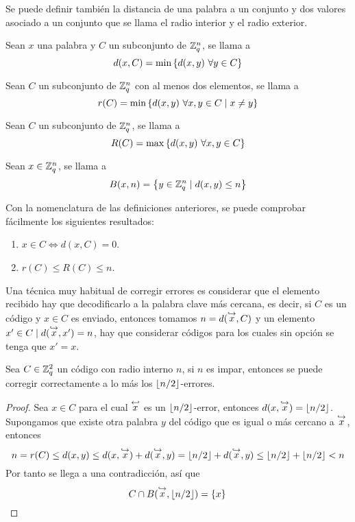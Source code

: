 Se puede definir también la distancia de una palabra a un conjunto y dos valores asociado a un conjunto que se llama el radio interior y el radio exterior.

\begin{definition}
	Sean $x$ una palabra y $C$ un subconjunto de $\mathbb{Z}_q^n$, se llama  a
	\[
		d(x, C) = \min\left\{d(x,y)\ \forall y\in C\right\}
	\]
\end{definition}

\begin{definition}
	Sean $C$ un subconjunto de $\mathbb{Z}_q^n$ con al menos dos elementos, se llama  a
	\[
		r(C) = \min\left\{d(x,y)\ \forall x,y\in C\mid x\neq y\right\}
	\]
\end{definition}

\begin{definition}
	Sean $C$ un subconjunto de $\mathbb{Z}_q^n$, se llama  a
	\[
		R(C) = \max\left\{d(x,y)\ \forall x,y\in C\right\}
	\]
\end{definition}

\begin{definition}
	Sean $x\in\mathbb{Z}_q^n$, se llama  a
	\[
		B(x, n) = \left\{y\in\mathbb{Z}_q^n \mid d(x,y)\leq n\right\}
	\]
\end{definition}

Con la nomenclatura de las definiciones anteriores, se puede comprobar fácilmente los siguientes resultados:
\begin{enumerate}
	\item $x\in C \iff d(x, C) = 0$.
	\item $r(C)\leq R(C) \leq n$.
\end{enumerate}

Una técnica muy habitual de corregir errores es considerar que el elemento recibido hay que decodificarlo a la palabra clave más cercana, es decir, si $C$ es un código y $x\in C$ es enviado, entonces tomamos $n=d(\stackrel{\hookrightarrow}{x}, C)$ y un elemento $x'\in C\mid d(\stackrel{\hookrightarrow}{x}, x')=n$, hay que considerar códigos para los cuales sin opción se tenga que $x'=x$.

\begin{lemma}
	Sea $C\in\mathbb{Z}_q^2$ un código con radio interno $n$, si $n$ es impar, entonces se puede corregir correctamente a lo más los $\lfloor n/2 \rfloor$-errores.
\end{lemma}
\begin{proof}
	Sea $x\in C$ para el cual $\stackrel{\hookleftarrow}{x}$ es un $\lfloor n/2 \rfloor$-error, entonces $d(x, \stackrel{\hookrightarrow}{x})=\lfloor n/2 \rfloor$.
	Supongamos que existe otra palabra $y$ del código que es igual o más cercano a $\stackrel{\hookrightarrow}{x}$, entonces
	\[
		n = r(C) \leq d(x, y) \leq d(x, \stackrel{\hookrightarrow}{x}) + d(\stackrel{\hookrightarrow}{x}, y) = \lfloor n/2 \rfloor + d(\stackrel{\hookrightarrow}{x}, y) \leq \lfloor n/2 \rfloor + \lfloor n/2 \rfloor < n
	\]
	Por tanto se llega a una contradicción, así que
	\[
		C\cap B(\stackrel{\hookrightarrow}{x}, \lfloor n/2 \rfloor) = \left\{x\right\}\qedhere
	\]
\end{proof}

